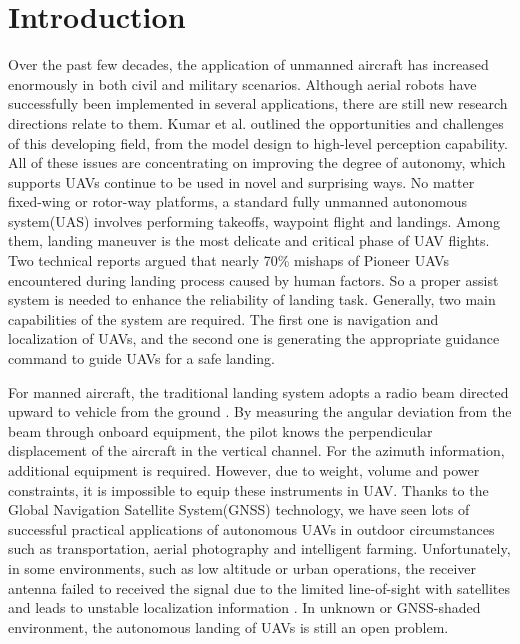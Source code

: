 \section{Introduction}
\label{intro}
Over the past few decades, the application of unmanned aircraft has increased enormously in both civil and military scenarios. Although aerial robots have successfully been implemented in several applications, there are still new research directions relate to them. Kumar et al. \cite{kumar2012opportunities} outlined the opportunities and challenges of this developing field, from the model design to high-level perception capability. All of these issues are concentrating on improving the degree of autonomy, which supports UAVs continue to be used in novel and surprising ways.
No matter fixed-wing or rotor-way platforms, a standard fully unmanned autonomous system(UAS) involves performing takeoffs, waypoint flight and landings. Among them, landing maneuver is the most delicate and critical phase of UAV flights. Two technical reports \cite{manning2004role} argued that nearly 70\% mishaps of Pioneer UAVs encountered during landing process caused by human factors. So a proper assist system is needed to enhance the reliability of landing task. Generally, two main capabilities of the system are required. The first one is navigation and localization of UAVs, and the second one is generating the appropriate guidance command to guide UAVs for a safe landing. 

For manned aircraft, the traditional landing system adopts a radio beam directed upward to vehicle from the ground \cite{stevens2003aircraft}. By measuring the angular deviation from the beam through onboard equipment, the pilot knows the perpendicular displacement of the aircraft in the vertical channel. For the azimuth information, additional equipment is required. However, due to weight, volume and power constraints, it is impossible to equip these instruments in UAV. Thanks to the Global Navigation Satellite System(GNSS) technology, we have seen lots of successful practical applications of autonomous UAVs in outdoor circumstances such as transportation, aerial photography and intelligent farming. Unfortunately, in some environments, such as low altitude or urban operations, the receiver antenna failed to received the signal due to the limited line-of-sight with satellites and leads to unstable localization information \cite{farrell1998gps}. In unknown or GNSS-shaded environment, the autonomous landing of UAVs is still an open problem. 

